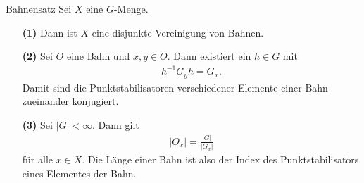 \begin{genericthm}{Bahnensatz}\label{2.5} 
Sei $X$ eine $G$-Menge.
\begin{enumerate}
\item[\textbf{(1)}]
Dann ist $X$ eine disjunkte Vereinigung von Bahnen.
\item[\textbf{(2)}]
Sei $O$ eine Bahn und $x,y \in O$.
Dann existiert ein $h \in G$ mit
\begin{align*}
h^{-1} G_y h = G_x.
\end{align*}
Damit sind die Punktstabilisatoren verschiedener Elemente einer Bahn zueinander konjugiert.
\item[\textbf{(3)}]
Sei $|G| < \infty$. Dann gilt
\begin{align*}
|O_x| = \frac{|G|}{|G_x|}
\end{align*}
für alle $x \in X$.
Die Länge einer Bahn ist also der Index des Punktstabilisators eines Elementes der Bahn.
\end{enumerate}
\end{genericthm}

